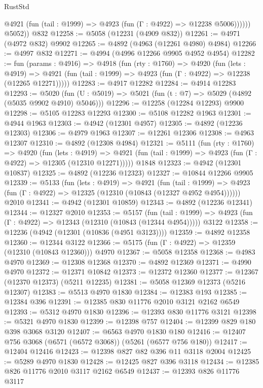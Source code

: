 \begin{lexlean}{RustStd}
\begin{coremodule}
              @4921 (fun (tail : @1999) => @4923 (fun (Γ : @4922) => @12238 @5006))))))
        @5052))
    @832
@12258 := @5058 (@12231 (@4909 @832))
@12261 := @4971 (@4972 @832) @9902
@12265 := @4892 (@4963 (@12261 @4980) @4984)
@12266 := @4997 @832
@12271 := @4994 (@4996 @12266 @9905 @4952 @4954)
@12282 := fun (params : @4916) =>
  @4918
    (fun (rty : @1760) =>
    @4920
      (fun (lets : @4919) =>
      @4921 (fun (tail : @1999) => @4923 (fun (Γ : @4922) => @12238 (@12265 @12271)))))
@12283 := @4917 @12282
@12284 := @4914 @12283
@12293 := @5020 (fun (U : @5019) => @5021 (fun (t : @7) => @5029 (@4892 (@5035 @9902 @4910) @5046)))
@12296 := @12258 (@12284 @12293) @9900
@12298 := @5105 @12283 @12293
@12300 := @5108 @12282 @1963
@12301 := @4944 @1963
@12303 := @4942 (@12301 @4957)
@12305 := @4892 (@12236 @12303)
@12306 := @4979 @1963
@12307 := @12261 @12306
@12308 := @4963 @12307
@12310 := @4892 (@12308 @4984)
@12321 := @5111
    (fun (rty : @1760) =>
    @4920
      (fun (lets : @4919) =>
      @4921 (fun (tail : @1999) => @4923 (fun (Γ : @4922) => @12305 (@12310 @12271)))))
    @1848
@12323 := @4942 (@12301 @10837)
@12325 := @4892 (@12236 @12323)
@12327 := @10844 @12266 @9905
@12339 := @5133
    (fun (lets : @4919) =>
    @4921
      (fun (tail : @1999) =>
      @4923 (fun (Γ : @4922) => @12325 (@12310 (@10843 (@12327 @4952 @4954))))))
    @2010
@12341 := @4942 (@12301 @10859)
@12343 := @4892 (@12236 @12341)
@12344 := @12327 @2010
@12353 := @5157
    (fun (tail : @1999) => @4923 (fun (Γ : @4922) => @12343 (@12310 (@10843 (@12344 @4954)))))
    @3122
@12358 := @12236 (@4942 (@12301 (@10836 (@4951 @3123))))
@12359 := @4892 @12358
@12360 := @12344 @3122
@12366 := @5175 (fun (Γ : @4922) => @12359 (@12310 (@10843 @12360))) @4970
@12367 := @5058 @12358
@12368 := @4983 @4970
@12369 := @12308 @12368
@12370 := @4892 @12369
@12371 := @4990 @4970
@12372 := @12371 @10842
@12373 := @12372 @12360
@12377 := @12367 (@12370 @12373) (@5211 @12235)
@12381 := @5058 @12369 @12373 (@5216 @12307)
@12383 := @5513 @4970 @1830
@12384 := @12383 @193
@12385 := @12384 @396
@12391 := @12385 @830 @11776 @2010 @3121 @2162 @6549
@12393 := @5312 @4970 @1830
@12396 := @12393 @830 @11776 @3121
@12398 := @5321 @4970 @1830
@12399 := @12398 @757
@12404 := @12399 @829 @180 @398 @3068 @3120
@12407 := @6563 @4970 @1830 @180
@12416 := @12407 @756 @3068 (@6571 (@6572 @3068)) (@5261 (@6577 @756 @180))
@12417 := @12404 @12416
@12423 := @12398 @827 @82 @396 @11 @3118 @2004
@12425 := @5289 @4970 @1830
@12428 := @12425 @827 @396 @3118
@12434 := @12385 @826 @11776 @2010 @3117 @2162 @6549
@12437 := @12393 @826 @11776 @3117

\end{coremodule}
\end{lexlean}
